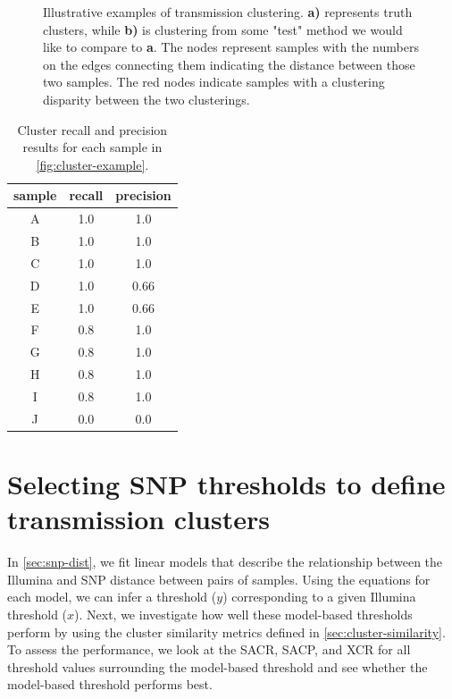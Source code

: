 \begin{figure}
\begin{subfigure}[b]{0.4\textwidth}
         \caption{}
         \label{fig:example-test}
     \end{subfigure}
        \caption{Illustrative examples of transmission clustering. \textbf{a)} represents truth clusters, while \textbf{b)} is clustering from some "test" method we would like to compare to \textbf{a}. The nodes represent samples with the numbers on the edges connecting them indicating the distance between those two samples. The red nodes indicate samples with a clustering disparity between the two clusterings.}
        \label{fig:cluster-example}
\end{figure}

\begin{table}
\centering
\begin{tabular}{|c|c|c|}
sample & recall & precision \\
\hline
A      & 1.0    & 1.0       \\
B      & 1.0    & 1.0       \\
C      & 1.0    & 1.0       \\
D      & 1.0    & 0.66      \\
E      & 1.0    & 0.66      \\
F      & 0.8    & 1.0       \\
G      & 0.8    & 1.0       \\
H      & 0.8    & 1.0       \\
I      & 0.8    & 1.0       \\
J      & 0.0      & 0.0        
\end{tabular}
\caption{Cluster recall and precision results for each sample in \autoref{fig:cluster-example}.}
\label{tab:cluster-example}
\end{table}


\section{Selecting \ont{} SNP thresholds to define transmission clusters}
\label{app:dist-sweep}

In \autoref{sec:snp-dist}, we fit linear models that describe the relationship between the Illumina and \ont{} SNP distance between pairs of samples. Using the equations for each model, we can infer a \ont{} threshold ($y$) corresponding to a given Illumina threshold ($x$). Next, we investigate how well these model-based thresholds perform by using the cluster similarity metrics defined in \autoref{sec:cluster-similarity}. To assess the performance, we look at the SACR, SACP, and XCR for all threshold values surrounding the model-based threshold and see whether the model-based threshold performs best.


